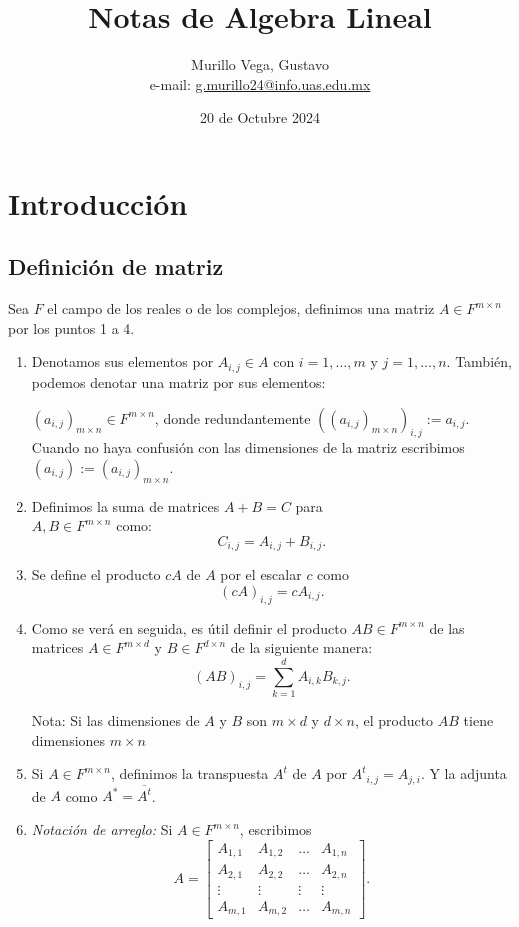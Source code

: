 \documentclass{article}
\title{Notas de Algebra Lineal}
\author{Murillo Vega, Gustavo \\ e-mail:
\href{mailto:g.murillo24@info.uas.edu.mx}{g.murillo24@info.uas.edu.mx}}
\date{20 de Octubre 2024}
\begin{document}
\maketitle

\section{Introducción}
\subsection{Definición de matriz}
Sea ${F}$ el campo de los reales o de los complejos, definimos una matriz $A\in {F}^{m\times n}$ por los puntos 1 a 4.
\begin{enumerate}
    \item Denotamos sus elementos por $A_{i,j}\in A$ con  $i=1,\ldots,m$ y $j=1,\ldots,n$. También, podemos denotar una matriz por sus elementos:
    
    $(a_{i,j})_{m\times n} \in {F}^{m\times n}$, donde redundantemente $((a_{i,j})_{m\times n})_{i,j} := a_{i,j}$.\\
    Cuando no haya confusión con las dimensiones de la matriz
    escribimos\\ $(a_{i,j}) := (a_{i,j})_{m\times n}$.
    
    \item Definimos la suma de matrices $A+B = C$ para
    \\ $A, B \in {F}^{m\times n}$ como:
    $$C_{i,j}=A_{i,j} + B_{i,j}.$$

    \item Se define el producto $cA$ de $A$ por el escalar $c$
    como $$(cA)_{i,j} = cA_{i,j}.$$
    
    \item Como se verá en seguida, es útil definir el producto
    $AB\in {F}^{m\times n}$ de las matrices $A\in {F}^{m\times d}$ y
    $B \in {F}^{d\times n}$ de la siguiente manera:
    $$(AB)_{i,j} = \sum^d_{k=1} A_{i,k} B_{k,j}.$$
    
    Nota: Si las dimensiones de $A$ y $B$ son $m\times d$
    y $d\times n$, el producto $AB$ tiene dimensiones $m\times n$

    \item Si $A\in F^{m\times n}$, definimos la transpuesta $A^t$
    de $A$ por ${A^t}_{i,j} = A_{j,i}$.
    Y la adjunta de $A$ como $A^* = \overline{A^t}$.

    \item \textit{Notación de arreglo:} Si
    $A\in {F}^{m\times n}$, escribimos
    $$A = \begin{bmatrix}
        A_{1,1} & A_{1,2} & \ldots & A_{1, n} \\
        A_{2,1} & A_{2,2} & \ldots & A_{2, n} \\
        \vdots & \vdots & \vdots & \vdots \\
        A_{m,1} & A_{m,2} & \ldots & A_{m, n}
    \end{bmatrix}.$$
\end{enumerate}
\end{document}
